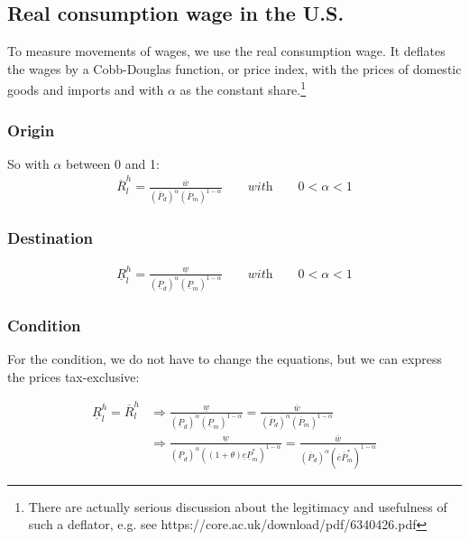 \subsection*{Real consumption wage in the U.S.}
To measure movements of wages, we use the real consumption wage. It deflates the wages by a Cobb-Douglas function, or price index, with the prices of domestic goods and imports and with $\alpha$ as the constant share.\footnote{There are actually serious discussion about the legitimacy  and usefulness of such a deflator, e.g. see https://core.ac.uk/download/pdf/6340426.pdf}

\subsubsection*{Origin}
So with $\alpha$ between 0 and 1:
\begin{equation}\label{conw.o}
\begin{aligned}
\overline R^{h}_l = \frac{\overline w}{ \left( \overline P_{d} \right) ^{\alpha}  \left( \overline P_m \right) ^{1-\alpha}} \qquad \textit{with} \qquad 0 < \alpha < 1 \end{aligned}  \end{equation}

\subsubsection*{Destination}
\begin{equation}\label{conw.d}
\begin{aligned}
\underline R^{h}_l = \frac{\underline w}{ \left( \underline P_{d} \right) ^{\alpha}  \left( \underline P_m \right) ^{1-\alpha}}\qquad \textit{with} \qquad 0 < \alpha < 1 \end{aligned}  \end{equation}

\subsubsection*{Condition}
For the condition, we do not have to change the equations, but we can express the prices tax-exclusive:

\begin{equation}\label{conw.con}
\begin{aligned}
\underline R^{h}_l = \overline R^{h}_l &\Rightarrow \frac{\underline w}{ \left( \underline P_{d} \right) ^{\alpha}  \left( \underline P_m \right) ^{1-\alpha}} = \frac{\overline w}{ \left( \overline P_{d} \right) ^{\alpha}  \left( \overline P_m \right) ^{1-\alpha}} \\ &\Rightarrow \frac{\underline w}{ \left( \underline P_{d} \right) ^{\alpha}  \left( (1+\theta) \underline e  \underline P_m^* \right) ^{1-\alpha}} = \frac{\overline w}{ \left( \overline P_{d} \right) ^{\alpha}  ( \overline e \overline P_m^* ) ^{1-\alpha}}
\end{aligned}  
\end{equation}

